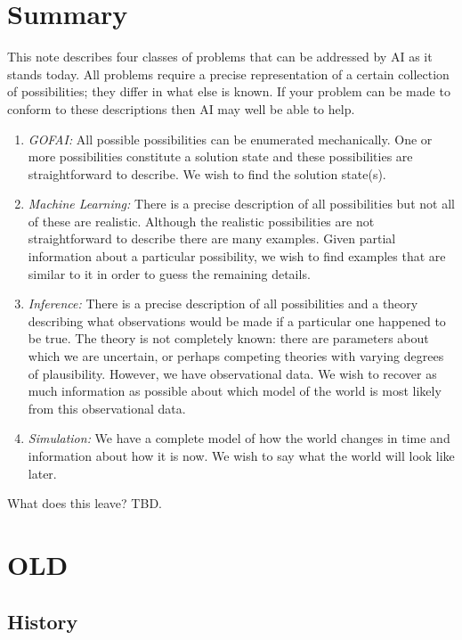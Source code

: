 \documentclass[10pt, a4, twocolumn]{article}
\begin{document}
\section{Summary}

This note describes four classes of problems that can be addressed by AI as it
stands today. All problems require a precise representation of a certain
collection of possibilities; they differ in what else is known. If your problem
can be made to conform to these descriptions then AI may well be able to help.

\begin{enumerate}
\item \emph{GOFAI:} All possible possibilities can be enumerated
  mechanically. One or more possibilities constitute a solution state and these
  possibilities are straightforward to describe. We wish to find the solution
  state(s).
\item \emph{Machine Learning:} There is a precise description of all
  possibilities but not all of these are realistic. Although the realistic
  possibilities are not straightforward to describe there are many
  examples. Given partial information about a particular possibility, we wish to
  find examples that are similar to it in order to guess the remaining details.
\item \emph{Inference:} There is a precise description of all possibilities and
  a theory describing what observations would be made if a particular one
  happened to be true. The theory is not completely known: there are parameters
  about which we are uncertain, or perhaps competing theories with varying
  degrees of plausibility. However, we have observational data. We wish to
  recover as much information as possible about which model of the world is most
  likely from this observational data.
\item \emph{Simulation:} We have a complete model of how the world changes in
  time and information about how it is now. We wish to say what the world will
  look like later.
\end{enumerate}

What does this leave? TBD.

\newpage
\section{OLD}

\subsection{History}
\end{document}

